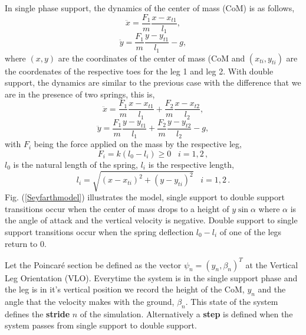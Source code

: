 \noindent In single phase support, the dynamics of the center of mass (CoM) is as follows,
\begin{equation}
  \ddot{x}=\frac{F_1}{m}\frac{x-x_{t1}}{l_1},
  \label{eq.singlesuppx}
  \end{equation}
\begin{equation}
  \ddot{y}=\frac{F_1}{m}\frac{y-y_{t1}}{l_1}-g,
  \label{eq.singlesuppy}
\end{equation}
 where $(x,y)$ are the coordinates of the center of mass (CoM  and $(x_{ti},y_{ti})$ are the coordenates of the respective toes for the leg 1 and leg 2.
\noindent With double support, the dynamics are similar to the previous case with the difference that we are in the presence of two springs, this is,
\begin{equation}
 \ddot{x}=\frac{F_1}{m}\frac{x-x_{t1}}{l_1}+\frac{F_2}{m}\frac{x-x_{t2}}{l_2},
 \label{eq.doublesuppx}
  \end{equation}
\begin{equation}
  \ddot{y}=\frac{F_1}{m}\frac{y-y_{t1}}{l_1}+\frac{F_2}{m}\frac{y-y_{t2}}{l_2}-g,
  \label{eq.doublesuppy}
\end{equation}
with $F_i$ being the force applied on the mass by the respective leg,
\begin{equation}
  F_i=k(l_0-l_i)\geq 0 \,\,\,\,\, i=1,2\,,
\end{equation}
$l_0$ is the natural length of the spring, $l_i$ is the respective length,
\begin{equation}
l_i=\sqrt{(x-x_{ti})^2+(y-y_{ti})^2} \,\,\,\,\, i =1,2 \,.
\end{equation}
\noindent  Fig. (\ref{Seyfarthmodel}) illustrates the model, single support to double support transitions occur when the center of mass drops to a height of $y \sin{\alpha}$ where $\alpha$ is the angle of attack and the vertical velocity is negative. Double support to single support transitions occur when the spring deflection $l_0 - l_i$ of one of the legs return to 0.

Let the Poincaré section be defined as the vector $\psi_n=(y_n,\beta_n)^T$ at the Vertical Leg Orientation (VLO). Everytime the system is in the single support phase and the leg is in it's vertical position we record the height of the CoM, $y_n$ and the angle that the velocity makes with the ground, $\beta_n$. This state of the system defines the \textbf{stride} $n$ of the simulation. Alternatively a \textbf{step} is defined when the system passes from single support to double support.

